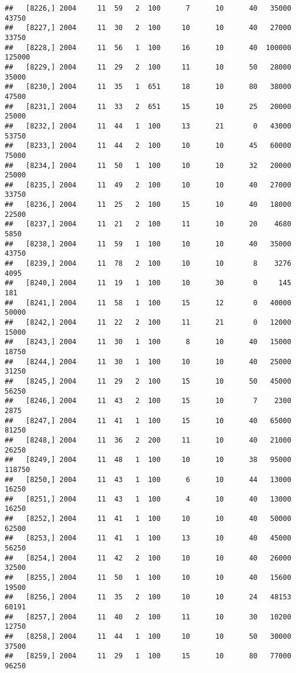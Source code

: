 \documentclass{article}\usepackage[]{graphicx}\usepackage[]{color}
\makeatletter
\newenvironment{kframe}{%
 \def\at@end@of@kframe{}%
 \ifinner\ifhmode%
  \def\at@end@of@kframe{\end{minipage}}%
  \begin{minipage}{\columnwidth}%
 \fi\fi%
 \def\FrameCommand##1{\hskip\@totalleftmargin \hskip-\fboxsep
 \colorbox{shadecolor}{##1}\hskip-\fboxsep
     \hskip-\linewidth \hskip-\@totalleftmargin \hskip\columnwidth}%
 \MakeFramed {\advance\hsize-\width
   \@totalleftmargin\z@ \linewidth\hsize
   \@setminipage}}%
 {\par\unskip\endMakeFramed%
 \at@end@of@kframe}
\newenvironment{knitrout}{}{} %
\makeatother
\begin{document}
\begin{knitrout}
\begin{kframe}
\begin{verbatim}
##   [8226,] 2004     11  59   2  100      7      10      40   35000   43750
##   [8227,] 2004     11  30   2  100     10      10      40   27000   33750
##   [8228,] 2004     11  56   1  100     16      10      40  100000  125000
##   [8229,] 2004     11  29   2  100     11      10      50   28000   35000
##   [8230,] 2004     11  35   1  651     18      10      80   38000   47500
##   [8231,] 2004     11  33   2  651     15      10      25   20000   25000
##   [8232,] 2004     11  44   1  100     13      21       0   43000   53750
##   [8233,] 2004     11  44   2  100     10      10      45   60000   75000
##   [8234,] 2004     11  50   1  100     10      10      32   20000   25000
##   [8235,] 2004     11  49   2  100     10      10      40   27000   33750
##   [8236,] 2004     11  25   2  100     15      10      40   18000   22500
##   [8237,] 2004     11  21   2  100     11      10      20    4680    5850
##   [8238,] 2004     11  59   1  100     10      10      40   35000   43750
##   [8239,] 2004     11  78   2  100     10      10       8    3276    4095
##   [8240,] 2004     11  19   1  100     10      30       0     145     181
##   [8241,] 2004     11  58   1  100     15      12       0   40000   50000
##   [8242,] 2004     11  22   2  100     11      21       0   12000   15000
##   [8243,] 2004     11  30   1  100      8      10      40   15000   18750
##   [8244,] 2004     11  30   1  100     10      10      40   25000   31250
##   [8245,] 2004     11  29   2  100     15      10      50   45000   56250
##   [8246,] 2004     11  43   2  100     15      10       7    2300    2875
##   [8247,] 2004     11  41   1  100     15      10      40   65000   81250
##   [8248,] 2004     11  36   2  200     11      10      40   21000   26250
##   [8249,] 2004     11  48   1  100     10      10      38   95000  118750
##   [8250,] 2004     11  43   1  100      6      10      44   13000   16250
##   [8251,] 2004     11  43   1  100      4      10      40   13000   16250
##   [8252,] 2004     11  41   1  100     10      10      40   50000   62500
##   [8253,] 2004     11  41   1  100     13      10      40   45000   56250
##   [8254,] 2004     11  42   2  100     10      10      40   26000   32500
##   [8255,] 2004     11  50   1  100     10      10      40   15600   19500
##   [8256,] 2004     11  35   2  100     10      10      24   48153   60191
##   [8257,] 2004     11  40   2  100     11      10      30   10200   12750
##   [8258,] 2004     11  44   1  100     10      10      50   30000   37500
##   [8259,] 2004     11  29   1  100     15      10      80   77000   96250

\end{verbatim}
\end{kframe}
\end{knitrout}
\end{document}
